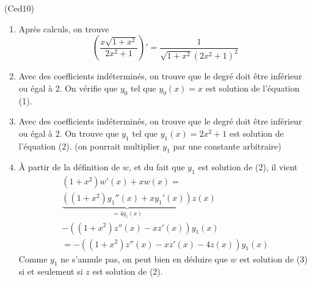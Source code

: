 \begin{tiny}(Ced10)\end{tiny}
\begin{enumerate}
 \item Après calculs, on trouve
\begin{displaymath}
  \left( \frac{x\sqrt{1+x^2}}{2x^2+1}\right)' =
\frac{1}{\sqrt{1+x^2}(2x^2+1)^2} 
\end{displaymath}

 \item Avec des coefficients indéterminés, on trouve que le degré doit être inférieur ou égal à 2. On vérifie que $y_0$ tel que $y_0(x)=x$  est solution de l'équation (1).

 \item Avec des coefficients indéterminés, on trouve que le degré doit être inférieur ou égal à 2. On trouve que $y_1$ tel que $y_1(x)=2x^2 + 1$  est solution de l'équation (2). (on pourrait multiplier $y_1$ par une constante arbitraire)

 \item À partir de la définition de $w$, et du fait que $y_1$ est solution de (2), il vient
\begin{multline*}
 (1+x^2)w'(x) + xw(x) = \\
 \underset{=4y_1(x)}{\underbrace{\left((1+x^2)y_1''(x) +x y_1'(x) \right)}}z(x) \\
 - \left( (1+x^2)z''(x)-xz'(x)\right)y_1(x) \\
= -\left((1+x^2)z''(x)-xz'(x)-4z(x) \right)y_1(x)   
\end{multline*}
Comme $y_1$ ne s'annule pas, on peut bien en déduire que $w$ est solution de (3) si et seulement si $z$ est solution de (2).


\end{enumerate}
